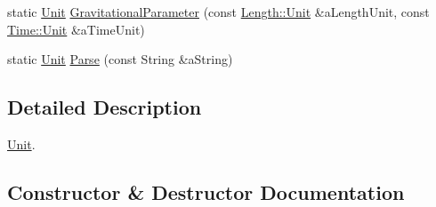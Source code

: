 \begin{DoxyCompactItemize}
\item 
static \hyperlink{classlibrary_1_1physics_1_1units_1_1_derived_1_1_unit}{Unit} \hyperlink{classlibrary_1_1physics_1_1units_1_1_derived_1_1_unit_a583c1a64f6220c2a9296f3aa4a2ad989}{Gravitational\+Parameter} (const \hyperlink{classlibrary_1_1physics_1_1units_1_1_length_a3b8b39cd245cf6b19dc34459baeccb18}{Length\+::\+Unit} \&a\+Length\+Unit, const \hyperlink{classlibrary_1_1physics_1_1units_1_1_time_ab876a6a05c9a2f28905f2753bfd64109}{Time\+::\+Unit} \&a\+Time\+Unit)
\item 
static \hyperlink{classlibrary_1_1physics_1_1units_1_1_derived_1_1_unit}{Unit} \hyperlink{classlibrary_1_1physics_1_1units_1_1_derived_1_1_unit_aa712ff5245e4badf615c04f8e1cbdb51}{Parse} (const String \&a\+String)
\end{DoxyCompactItemize}


\subsection{Detailed Description}
\hyperlink{classlibrary_1_1physics_1_1units_1_1_derived_1_1_unit}{Unit}. 

\subsection{Constructor \& Destructor Documentation}
\mbox{\label{classlibrary_1_1physics_1_1units_1_1_derived_1_1_unit_afae7260b526cdd8379eda7e69d7b42b8}} 
